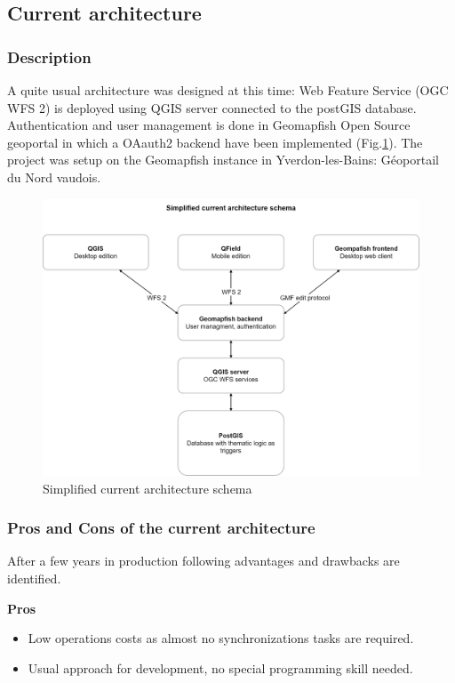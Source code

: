 \documentclass[runningheads]{llncs}
\begin{document}
\subsection{Current architecture}

\subsubsection{Description}

A quite usual architecture was designed at this time: Web Feature Service (OGC WFS 2)\cite{ref_wfs2} is deployed using QGIS\cite{ref_qfield} server connected to the postGIS database. Authentication and user management is done in Geomapfish Open Source geoportal\cite{ref_article1} in which a OAauth2 backend have been implemented (Fig.\ref{fig3}). The project was setup on the Geomapfish instance in Yverdon-les-Bains: Géoportail du Nord vaudois\cite{ref_article2}.

\begin{figure}
	\includegraphics[width=\textwidth]{architecture.drawio.png}
	\caption{Simplified current architecture schema} \label{fig3}
\end{figure}


\subsubsection{Pros and Cons of the current architecture}

After a few years in production following advantages and drawbacks are identified.

\textbf{Pros} 
\begin{itemize}
	\item Low operations costs as almost no synchronizations tasks are required.
	\item Usual approach for development, no special programming skill needed. 
\end{itemize}
\end{document}
